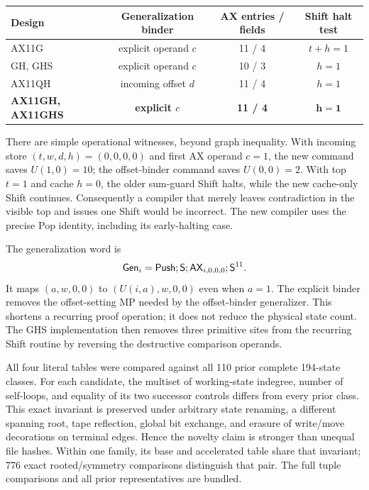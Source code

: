\begin{center}\small
\begin{tabular}{lccc}
\toprule
Design & Generalization binder & AX entries / fields & Shift halt test\\
\midrule
AX11G & explicit operand $c$ & 11 / 4 & $t+h=1$\\
GH, GHS & explicit operand $c$ & 10 / 3 & $h=1$\\
AX11QH & incoming offset $d$ & 11 / 4 & $h=1$\\
\textbf{AX11GH, AX11GHS} & \textbf{explicit $c$} & \textbf{11 / 4} & $\boldsymbol{h=1}$\\
\bottomrule
\end{tabular}
\end{center}

There are simple operational witnesses, beyond graph inequality. With
incoming store $(t,w,d,h)=(0,0,0,0)$ and first AX operand $c=1$, the
new command saves $U(1,0)=10$; the offset-binder command saves
$U(0,0)=2$. With top $t=1$ and cache $h=0$, the older sum-guard Shift
halts, while the new cache-only Shift continues. Consequently a
compiler that merely leaves contradiction in the visible top and issues
one Shift would be incorrect. The new compiler uses the precise Pop
identity, including its early-halting case.

The generalization word is
\[
 \mathsf{Gen}_i=\mathsf{Push};\mathsf{S};\mathsf{AX}_{i,0,0,0};\mathsf{S}^{11}.
\]
It maps $(a,w,0,0)$ to $(U(i,a),w,0,0)$ even when $a=1$.
The explicit binder removes the offset-setting MP needed by the
offset-binder generalizer. This shortens a recurring proof operation;
it does not reduce the physical state count. The GHS implementation
then removes three primitive sites from the recurring Shift routine by
reversing the destructive comparison operands.

All four literal tables were compared against all 110 prior complete
194-state classes. For each candidate, the multiset of working-state
indegree, number of self-loops, and equality of its two successor controls
differs from every prior class. This exact invariant is preserved under
arbitrary state renaming, a different spanning root, tape reflection,
global bit exchange, and erasure of write/move decorations on terminal
edges. Hence the novelty claim is stronger than unequal file hashes.
Within one family, its base and accelerated table share that invariant;
776 exact rooted/symmetry comparisons distinguish that pair. The full
tuple comparisons and all prior representatives are bundled.

